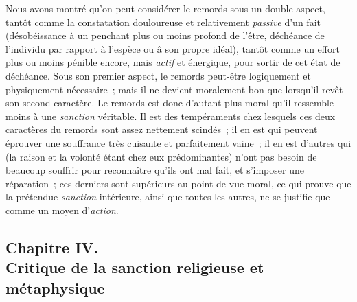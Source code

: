 \documentclass[french,twoside]{book} %
\begin{document}
Nous avons montré qu’on peut considérer le remords sous un double aspect, tantôt comme la constatation douloureuse et relativement \emph{passive} d’un fait (désobéissance à un penchant plus ou moins profond de l’être, déchéance de l’individu par rapport à l’espèce ou â son propre idéal), tantôt comme un effort plus ou moins pénible encore, mais \emph{actif} et énergique, pour sortir de cet état de déchéance. Sous son premier aspect, le remords peut-être logiquement et physiquement nécessaire ; mais il ne devient moralement bon que lorsqu’il revêt son second caractère. Le remords est donc d’autant plus moral qu’il ressemble moins à une \emph{sanction} véritable. Il est des tempéraments chez lesquels ces deux caractères du remords sont assez nettement scindés ; il en est qui peuvent éprouver une souffrance très cuisante et parfaitement vaine ; il en est d’autres qui (la raison et la volonté étant chez eux prédominantes) n’ont pas besoin de beaucoup souffrir pour reconnaître qu’ils ont mal fait, et s’imposer une réparation ; ces derniers sont supérieurs au point de vue moral, ce qui prouve que la prétendue \emph{sanction} intérieure, ainsi que toutes les autres, ne se justifie que comme un moyen d’\emph{action}.
\subsection[{Chapitre IV. Critique de la sanction religieuse et métaphysique}]{Chapitre IV. \\
Critique de la sanction religieuse et métaphysique}
\end{document}
